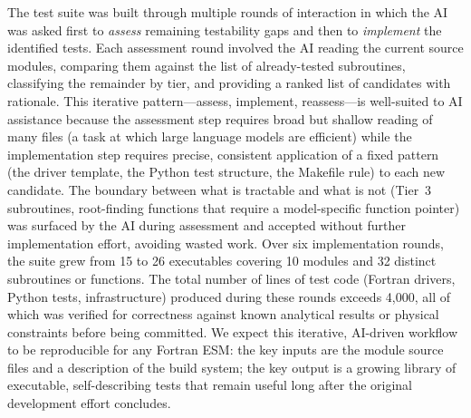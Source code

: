 The test suite was built through multiple rounds of interaction in which the AI was
asked first to \emph{assess} remaining testability gaps and then to
\emph{implement} the identified tests.  Each assessment round involved the AI
reading the current source modules, comparing them against the list of already-tested
subroutines, classifying the remainder by tier, and providing a ranked list of
candidates with rationale.  This iterative pattern—assess, implement, reassess—is
well-suited to AI assistance because the assessment step requires broad but shallow
reading of many files (a task at which large language models are efficient) while
the implementation step requires precise, consistent application of a fixed pattern
(the driver template, the Python test structure, the Makefile rule) to each new
candidate.  The boundary between what is tractable and what is not (Tier~3
subroutines, root-finding functions that require a model-specific function pointer)
was surfaced by the AI during assessment and accepted without further implementation
effort, avoiding wasted work.  Over six implementation rounds, the suite grew from
15 to 26 executables covering 10 modules and 32 distinct subroutines or functions.
The total number of lines of test code (Fortran drivers, Python tests,
infrastructure) produced during these rounds exceeds 4,000, all of which was
verified for correctness against known analytical results or physical constraints
before being committed.  We expect this iterative, AI-driven workflow to be
reproducible for any Fortran ESM: the key inputs are the module source files and
a description of the build system; the key output is a growing library of
executable, self-describing tests that remain useful long after the original
development effort concludes.
